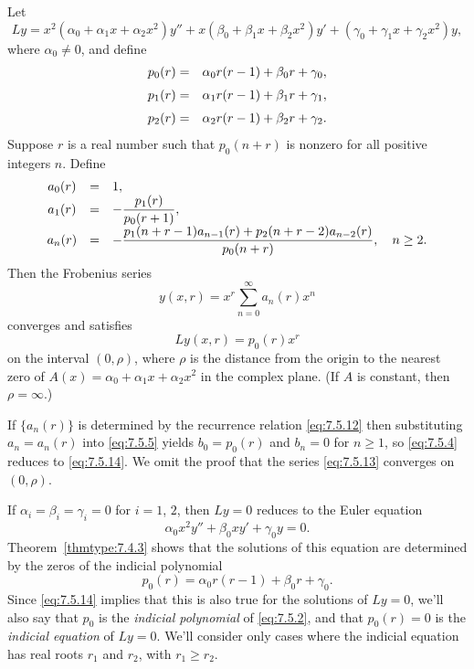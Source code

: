 \begin{theorem}
  \color{blue}
  \label{thmtype:7.5.2} Let
  \[
    Ly= x^{2}(\alpha_{0}+\alpha_{1}x+\alpha_{2}x^{2})y''+x(\beta_{0}+\beta_{1}x+\beta_{2}x^{2})y' +(\gamma_{0}+\gamma_{1}x+\gamma_{2}x^{2})y,
  \]
  where $\alpha_{0}\ne0$, and define
  \begin{eqnarray*}
    p_{0}(r)&=&\alpha_{0}r(r-1)+\beta_{0}r+\gamma_{0},\\[1\jot] p_{1}(r)&=&\alpha_{1}r(r-1)+\beta_{1}r+\gamma_{1},\\[1\jot] p_{2}(r)&=&\alpha_{2}r(r-1)+\beta_{2}r+\gamma_{2}.\\
  \end{eqnarray*}
  Suppose $r$ is a real number such that $p_{0}(n+r)$ is nonzero for all positive integers $n$.
  Define
  \begin{equation}
    \label{eq:7.5.12}
    \begin{array}{ccl}
      a_{0}(r) & = & 1,                                                                                 \\
      a_{1}(r) & = & -\displaystyle\frac{p_{1}(r)}{p_{0}(r+1)},                                                  \\[2\jot]
      a_{n}(r) & = & -\displaystyle\frac{p_{1}(n+r-1)a_{n-1}(r)+p_{2}(n+r-2)a_{n-2}(r)}{p_{0}(n+r)},\quad n\ge2.
    \end{array}
  \end{equation}
  Then the Frobenius series
  \begin{equation}
    \label{eq:7.5.13}y(x,r)=x^{r}\sum_{n=0}^{\infty}a_{n}(r)x^{n}
  \end{equation}
  converges and satisfies
  \begin{equation}
    \label{eq:7.5.14}Ly(x,r)=p_{0}(r)x^{r}
  \end{equation}
  on the interval $(0,\rho)$, where $\rho$ is the distance from the origin to the nearest zero of
  $A(x)=\alpha_{0}+\alpha_{1}x+\alpha_{2}x^{2}$ in the complex plane. (If $A$ is constant, then
  $\rho=\infty$.)
\end{theorem}

If $\{a_{n}(r)\}$ is determined by the recurrence relation \eqref{eq:7.5.12} then substituting
$a_{n}=a_{n}(r)$ into \eqref{eq:7.5.5} yields $b_{0}=p_{0}(r)$ and $b_{n}=0$ for $n\ge1$, so
\eqref{eq:7.5.4} reduces to \eqref{eq:7.5.14}. We omit the proof that the series \eqref{eq:7.5.13}
converges on $(0,\rho)$.\bbox

If $\alpha_{i}=\beta_{i}=\gamma_{i}=0$ for $i=1$, $2$, then $Ly=0$ reduces to the Euler equation
\[
  \alpha_{0}x^{2}y''+\beta_{0}xy'+\gamma_{0}y=0.
\]
Theorem~\ref{thmtype:7.4.3} shows that the solutions of this equation are determined by the zeros of
the indicial polynomial
\[
  p_{0}(r)=\alpha_{0}r(r-1)+\beta_{0}r+\gamma_{0}.
\]
Since \eqref{eq:7.5.14} implies that this is also true for the solutions of $Ly=0$, we'll also say
that $p_{0}$ is the {\color{blue}\it indicial polynomial\/} of \eqref{eq:7.5.2}, and that
$p_{0}(r)=0$ is the {\color{blue}\it indicial equation\/} of $Ly=0$. We'll consider only cases where
the indicial equation has real roots $r_{1}$ and $r_{2}$, with $r_{1}\ge r_{2}$.


